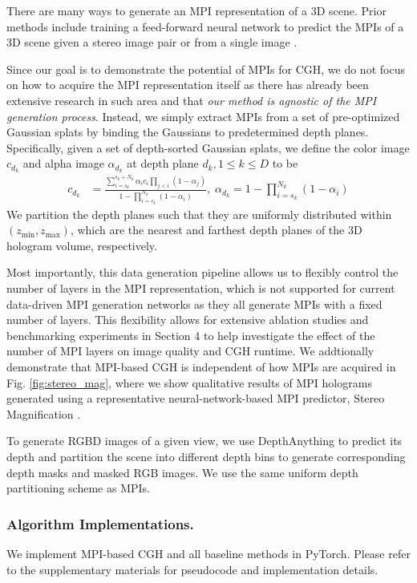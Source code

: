 There are many ways to generate an MPI representation of a 3D scene. Prior methods include training a feed-forward neural network to predict the MPIs of a 3D scene given a stereo image pair \cite{zhou2018mpi} or from a single image \cite{pu2023sinmpi, khan2023tiledmpi, tucker2020singlempi, han2022adaptivempi}.

Since our goal is to demonstrate the potential of MPIs for CGH, we do not focus on how to acquire the MPI representation itself as there has already been extensive research in such area and that \textit{our method is agnostic of the MPI generation process}. Instead, we simply extract MPIs from a set of pre-optimized Gaussian splats by binding the Gaussians to predetermined depth planes. Specifically, given a set of depth-sorted Gaussian splats, we define the color image $c_{d_k}$ and alpha image $\alpha_{d_k}$ at depth plane $d_k, 1\leq k\leq D$ to be 
\begin{align}
    c_{d_k} & = \frac{\sum_{i=s_k}^{s_k+N_k}\alpha_i c_i\prod_{j<i}(1-\alpha_j)}{1 - \prod_{i=s_k}^{N_k}(1-\alpha_i)}, \;
    \alpha_{d_k} = 1 - \prod_{i=s_k}^{N_k}(1-\alpha_i)
\end{align}
We partition the depth planes such that they are uniformly distributed within $(z_\text{min}, z_\text{max})$, which are the nearest and farthest depth planes of the 3D hologram volume, respectively.


Most importantly, this data generation pipeline allows us to flexibly control the number of layers in the MPI representation, which is not supported for current data-driven MPI generation networks as they all generate MPIs with a fixed number of layers. This flexibility allows for extensive ablation studies and benchmarking experiments in Section 4 to help investigate the effect of the number of MPI layers on image quality and CGH runtime. We addtionally demonstrate that MPI-based CGH is independent of how MPIs are acquired in Fig. \ref{fig:stereo_mag}, where we show qualitative results of MPI holograms generated using a representative neural-network-based MPI predictor, Stereo Magnification \cite{zhou2018mpi}. 
 
To generate RGBD images of a given view, we use DepthAnything \cite{depth_anything_v2} to predict its depth and partition the scene into different depth bins to generate corresponding depth masks and masked RGB images. We use the same uniform depth partitioning scheme as MPIs.

\subsubsection{Algorithm Implementations. } We implement MPI-based CGH and all baseline methods in PyTorch. Please refer to the supplementary materials for pseudocode and implementation details.

